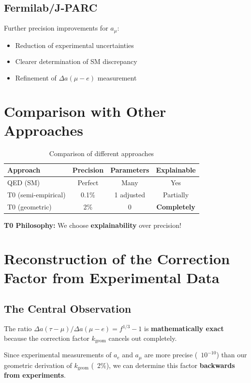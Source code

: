 	\subsection{Fermilab/J-PARC}
	
	Further precision improvements for $a_\mu$:
	\begin{itemize}
		\item Reduction of experimental uncertainties
		\item Clearer determination of SM discrepancy
		\item Refinement of $\Delta a(\mu - e)$ measurement
	\end{itemize}
	
	\section{Comparison with Other Approaches}
	
	\begin{table}[h]
		\centering
		\begin{tabular}{lccc}
			\toprule
			\textbf{Approach} & \textbf{Precision} & \textbf{Parameters} & \textbf{Explainable} \\
			\midrule
			QED (SM) & Perfect & Many & Yes \\
			T0 (semi-empirical) & 0.1\% & 1 adjusted & Partially \\
			T0 (geometric) & 2\% & 0 & \textbf{Completely} \\
			\bottomrule
		\end{tabular}
		\caption{Comparison of different approaches}
	\end{table}
	
	\textbf{T0 Philosophy:} We choose \textbf{explainability} over precision!
	
	\section{Reconstruction of the Correction Factor from Experimental Data}
	
	\subsection{The Central Observation}
	
	The ratio $\Delta a(\tau-\mu) / \Delta a(\mu-e) = f^{1/3} - 1$ is \textbf{mathematically exact} because the correction factor $k_{\text{geom}}$ cancels out completely.
	
	Since experimental measurements of $a_e$ and $a_\mu$ are more precise (~$10^{-10}$) than our geometric derivation of $k_{\text{geom}}$ (~2\%), we can determine this factor \textbf{backwards from experiments}.
	
